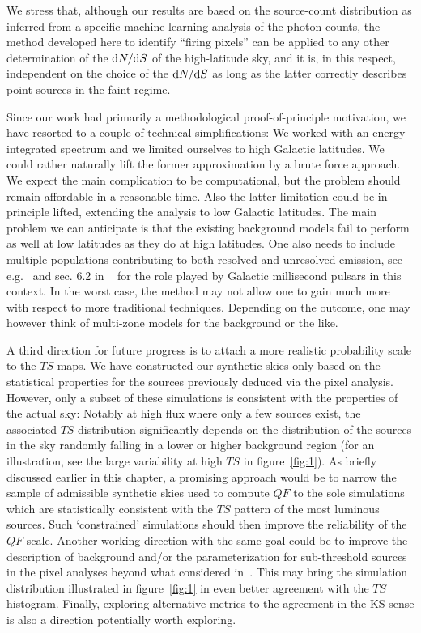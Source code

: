 We stress that, although our results are based on the source-count distribution as inferred from a specific machine learning analysis of the photon counts, the method developed here to identify ``firing pixels'' can be applied to any other determination of the $\textrm{d}N/\textrm{d}S$ of the high-latitude sky, and it is, in this respect, independent on the choice of the $\textrm{d}N/\textrm{d}S$ as long as the latter correctly describes point sources in the faint regime.

Since our work had primarily a methodological proof-of-principle motivation, we have resorted to a couple of technical simplifications: We worked with an energy-integrated spectrum and we limited ourselves to high Galactic latitudes. We could rather naturally lift the former approximation  by a brute force approach. We expect the main complication to be computational, but the problem should remain affordable in a reasonable time. Also the latter limitation could be in principle lifted, extending the analysis to low Galactic latitudes. The main problem we can anticipate is that the existing background models fail to perform as well at low latitudes as they do at high latitudes. One also needs to include multiple populations contributing to both resolved and unresolved emission, see e.g.~\cite{Calore:2014oga} and sec. 6.2 in ~\cite{Fermi-LAT:2015bhf} for the role played by Galactic millisecond pulsars in this context. In the worst case, the method may not allow one to gain much more with respect to more traditional techniques. Depending on the outcome, one may however think of multi-zone models for the background or the like.  

A third direction for future progress is to attach a  more realistic probability scale to the $TS$ maps. We have constructed our synthetic skies only based on the statistical properties for the sources previously deduced via the pixel analysis. However, only a subset of these simulations is consistent with the properties of the actual sky: Notably at high flux where only a few sources exist, the associated $TS$ distribution significantly depends on the distribution of the sources in the sky randomly falling in a lower or higher background region (for an illustration, see the large variability at high $TS$ in figure~\ref{fig:1}). As briefly discussed earlier in this chapter, a promising approach would be to narrow the sample of admissible synthetic skies used to compute $QF$ to the sole simulations which are statistically consistent with the $TS$ pattern of the most luminous sources. Such `constrained' simulations should then improve the reliability of the $QF$ scale. Another working direction with the same goal could be to improve the description of background and/or the parameterization for sub-threshold sources in the pixel analyses beyond what considered in~\cite{Amerio:2023uet}. This may bring the simulation distribution illustrated in figure~\ref{fig:1} in even better agreement with the $TS$ histogram. Finally, exploring alternative  metrics to the agreement in the KS sense is also a direction potentially worth exploring. 


